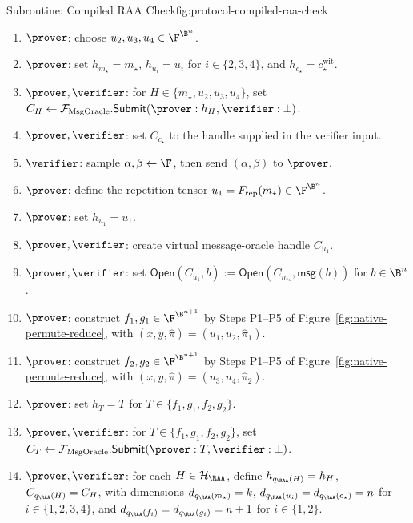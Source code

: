 \begin{protocolbox}{Subroutine: Compiled RAA Check}{fig:protocol-compiled-raa-check}
\smallskip
\begin{enumerate}[leftmargin=0.24in,label=\textbf{A\arabic*.},itemsep=0.06em,topsep=0.06em,parsep=0pt]
  \item \(\prover\): choose \(u_2,u_3,u_4\in\F^{\B^n}\).
  \item \(\prover\): set \(h_{m_\star}=m_\star\), \(h_{u_i}=u_i\) for
        \(i\in\{2,3,4\}\), and \(h_{c_\star}=c_\star^{\mathrm{wit}}\).
  \item \(\prover,\verifier\): for
        \(H\in\{m_\star,u_2,u_3,u_4\}\), set
        \(C_H\gets\mathcal F_{\mathrm{MsgOracle}}.\mathsf{Submit}
        (\prover:h_H,\verifier:\bot)\).
  \item \(\prover,\verifier\): set \(C_{c_\star}\) to the handle supplied in
        the verifier input.
  \item \(\verifier\): sample \(\alpha,\beta\leftarrow\F\), then send
        \((\alpha,\beta)\) to \(\prover\).
  \item \(\prover\): define the repetition tensor
        \(u_1=F_{\mathrm{rep}}(m_\star)\in\F^{\B^n}\).
  \item \(\prover\): set \(h_{u_1}=u_1\).
  \item \(\prover,\verifier\): create virtual message-oracle handle \(C_{u_1}\).
  \item \(\prover,\verifier\): set \(\mathsf{Open}(C_{u_1},b):=\mathsf{Open}(C_{m_\star},\mathsf{msg}(b))\) for \(b\in\B^n\).
  \item \(\prover\): construct \(f_1,g_1\in\F^{\B^{n+1}}\) by
        Steps P1--P5 of Figure~\ref{fig:native-permute-reduce}, with
        \((x,y,\widehat\pi)=(u_1,u_2,\widehat\pi_1)\).
  \item \(\prover\): construct \(f_2,g_2\in\F^{\B^{n+1}}\) by
        Steps P1--P5 of Figure~\ref{fig:native-permute-reduce}, with
        \((x,y,\widehat\pi)=(u_3,u_4,\widehat\pi_2)\).
  \item \(\prover\): set \(h_T=T\) for
        \(T\in\{f_1,g_1,f_2,g_2\}\).
  \item \(\prover,\verifier\): for
        \(T\in\{f_1,g_1,f_2,g_2\}\), set
        \(C_T\gets\mathcal F_{\mathrm{MsgOracle}}.\mathsf{Submit}
        (\prover:T,\verifier:\bot)\).
  \item \(\prover,\verifier\): for each \(H\in\mathcal H_{\RAA}\), define
        \(h_{q_{\RAA}(H)}=h_H\), \(C_{q_{\RAA}(H)}=C_H\), with dimensions
        \(d_{q_{\RAA}(m_\star)}=k\),
        \(d_{q_{\RAA}(u_i)}=d_{q_{\RAA}(c_\star)}=n\) for
        \(i\in\{1,2,3,4\}\), and
        \(d_{q_{\RAA}(f_i)}=d_{q_{\RAA}(g_i)}=n+1\) for \(i\in\{1,2\}\).

\end{enumerate}
\end{protocolbox}

